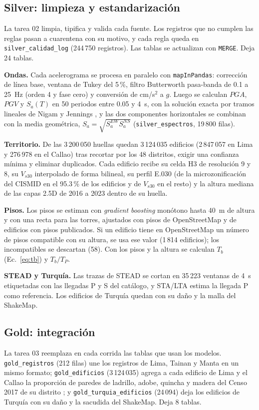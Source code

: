 \documentclass[conference]{IEEEtran}%
\newcommand{\vs}{V_{s30}}
\begin{document}
\subsection{Silver: limpieza y estandarización}
La tarea 02 limpia, tipifica y valida cada fuente. Los registros que no cumplen las reglas pasan a cuarentena con su motivo, y cada regla queda en \texttt{silver\_calidad\_log} (244\,750 registros). Las tablas se actualizan con \texttt{MERGE}. Deja 24 tablas.

\textbf{Ondas.} Cada acelerograma se procesa en paralelo con \texttt{mapInPandas}: corrección de línea base, ventana de Tukey del 5\,\%, filtro Butterworth pasa-banda de 0.1 a 25~Hz (orden 4 y fase cero) y conversión de cm/s$^2$ a $g$. Luego se calculan $PGA$, $PGV$ y $S_a(T)$ en 50 periodos entre 0.05 y 4~s, con la solución exacta por tramos lineales de Nigam y Jennings \cite{nigam1969}, y las dos componentes horizontales se combinan con la media geométrica, $S_a=\sqrt{S_a^{EW}S_a^{NS}}$ (\texttt{silver\_espectros}, 19\,800 filas).

\textbf{Territorio.} De las 3\,200\,050 huellas quedan 3\,124\,035 edificios (2\,847\,057 en Lima y 276\,978 en el Callao) tras recortar por los 48 distritos, exigir una confianza mínima y eliminar duplicados. Cada edificio recibe su celda H3 de resolución 9 y 8, su $\vs$ interpolado de forma bilineal, su perfil E.030 (de la microzonificación del CISMID en el 95.3\,\% de los edificios y de $\vs$ en el resto) y la altura mediana de las capas 2.5D de 2016 a 2023 dentro de su huella.

\textbf{Pisos.} Los pisos se estiman con \emph{gradient boosting} monótono hasta 40~m de altura y con una recta para las torres, ajustados con pisos de OpenStreetMap \cite{osm} y de edificios con pisos publicados. Si un edificio tiene en OpenStreetMap un número de pisos compatible con su altura, se usa ese valor (1\,814 edificios); los incompatibles se descartan (58). Con los pisos y la altura se calculan $T_b$ (Ec.~\eqref{eq:tb}) y $T_b/T_P$.

\textbf{STEAD y Turquía.} Las trazas de STEAD se cortan en 35\,223 ventanas de 4~s etiquetadas con las llegadas P y S del catálogo, y STA/LTA \cite{allen1978} estima la llegada P como referencia. Los edificios de Turquía quedan con su daño y la malla del ShakeMap.

\subsection{Gold: integración}
La tarea 03 reemplaza en cada corrida las tablas que usan los modelos. \texttt{gold\_registros} (212 filas) une los registros de Lima, Tainan y Manta en un mismo formato; \texttt{gold\_edificios} (3\,124\,035) agrega a cada edificio de Lima y el Callao la proporción de paredes de ladrillo, adobe, quincha y madera del Censo 2017 de su distrito \cite{inei_censo2017}; y \texttt{gold\_turquia\_edificios} (24\,094) deja los edificios de Turquía con su daño y la sacudida del ShakeMap. Deja 8 tablas.
\end{document}

